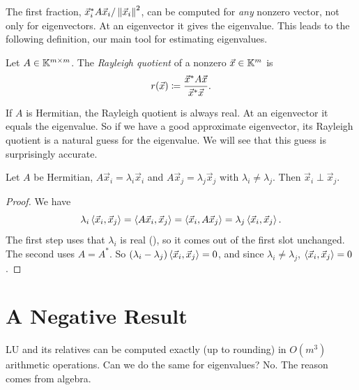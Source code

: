 The first fraction, $\vec{x}_i^\ast A\vec{x}_i/\left\lVert \vec{x}_i \right\rVert^2$, can be computed for \emph{any} nonzero vector, not only for eigenvectors. At an eigenvector it gives the eigenvalue. This leads to the following definition, our main tool for estimating eigenvalues.

\begin{definition}
  \label{def:rayleigh}
  Let $A \in \mathbb{K}^{m \times m}$. The \emph{Rayleigh quotient} of a nonzero $\vec{x} \in \mathbb{K}^m$ is
  \begin{equation}
    r(\vec{x}) \coloneqq \frac{\vec{x}^\ast A\vec{x}}{\vec{x}^\ast\vec{x}}.
  \end{equation}
\end{definition}

If $A$ is Hermitian, the Rayleigh quotient is always real. At an eigenvector it equals the eigenvalue. So if we have a good approximate eigenvector, its Rayleigh quotient is a natural guess for the eigenvalue. We will see that this guess is surprisingly accurate.

\begin{proposition}
  \label{prop:herm-orth}
  Let $A$ be Hermitian, $A\vec{x}_i = \lambda_i\vec{x}_i$ and $A\vec{x}_j = \lambda_j\vec{x}_j$ with $\lambda_i \ne \lambda_j$. Then $\vec{x}_i \perp \vec{x}_j$.
\end{proposition}

\begin{proof}
  We have
  \begin{equation}
    \lambda_i\left\langle \vec{x}_i, \vec{x}_j \right\rangle = \left\langle A\vec{x}_i, \vec{x}_j \right\rangle = \left\langle \vec{x}_i, A\vec{x}_j \right\rangle = \lambda_j\left\langle \vec{x}_i, \vec{x}_j \right\rangle.
  \end{equation}
  The first step uses that $\lambda_i$ is real (), so it comes out of the first slot unchanged. The second uses $A = A^\ast$. So $(\lambda_i - \lambda_j)\left\langle \vec{x}_i, \vec{x}_j \right\rangle = 0$, and since $\lambda_i \ne \lambda_j$, $\left\langle \vec{x}_i, \vec{x}_j \right\rangle = 0$.
\end{proof}

\section{A Negative Result}
\label{sec:negative-result}

LU and its relatives can be computed exactly (up to rounding) in $O(m^3)$ arithmetic operations. Can we do the same for eigenvalues? No. The reason comes from algebra.

